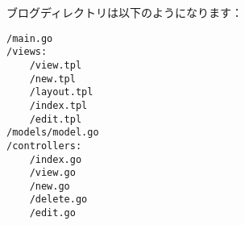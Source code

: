 ブログディレクトリは以下のようになります：

\begin{lstlisting}[numbers=none]
/main.go
/views:
    /view.tpl
    /new.tpl
    /layout.tpl
    /index.tpl
    /edit.tpl
/models/model.go
/controllers:
    /index.go
    /view.go
    /new.go
    /delete.go
    /edit.go            
\end{lstlisting}
